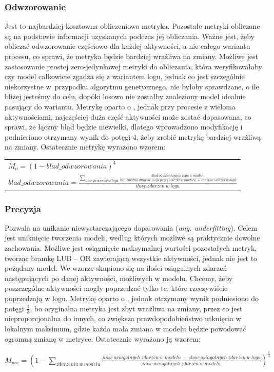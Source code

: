 \subsubsection{Odwzorowanie} 
Jest to najbardziej kosztowna obliczeniowo metryka. Pozostałe metryki obliczane są na podstawie informacji uzyskanych podczas jej obliczania. Ważne jest, żeby obliczać odwzorowanie częściowo dla każdej aktywności, a nie całego wariantu procesu, co sprawi, że metryka będzie bardziej wrażliwa na zmiany. Możliwe jest zastosowanie prostej zero-jedynkowej metryki do obliczania, która weryfikowałaby czy model całkowicie zgadza się z wariantem logu, jednak co jest szczególnie niekorzystne w~przypadku algorytmu genetycznego, nie byłoby sprawdzane, o ile bliżej jesteśmy do celu, dopóki losowo nie zostałby znaleziony model idealnie pasujący do wariantu. Metrykę oparto o \cite{metric-calculation}, jednak przy procesie z wieloma aktywnościami, najczęściej duża część aktywności może zostać dopasowana, co sprawi, że łączny błąd będzie niewielki, dlatego wprowadzono modyfikację i podniesiono otrzymany wynik do potęgi 4, żeby zrobić metrykę bardziej wrażliwą na zmiany. Ostatecznie metrykę wyrażono wzorem:
\begin{center}
\begin{tabular}{l}
$M_o = (1 - blad\_odwzorowania)^4$ \\
$blad\_odwzorowania = \frac{\sum_{ilosc\ procesow\ w\ logu} \frac{blad\ odwzorowania\ logu\ w\ modelu}{minimalna\ długosc\ najlepszej\ sciezki\ w\ modelu\ +\ długosc\ sciezki\ w\ logu}}{ilosc\ zdarzen \ w\ logu}$
\end{tabular}
\end{center}
\subsubsection{Precyzja} 
Pozwala na unikanie niewystarczającego dopasowania (\textit{ang. underfitting}). Celem jest uniknięcie tworzenia modeli, według których możliwe są praktycznie dowolne zachowania. Możliwe jest osiągnięcie maksymalnej wartości pozostałych metryk, tworząc bramkę LUB -- OR zawierającą wszystkie aktywności, jednak nie jest to pożądany model. We wzorze skupiono się na ilości osiągalnych zdarzeń następujących po danej aktywności, możliwych w modelu. Chcemy, żeby poszczególne aktywności mogły poprzedzać tylko te, które rzeczywiście poprzedzają w logu. Metrykę oparto o \cite{precision-calculation}, jednak otrzymany wynik podniesiono do potęgi $\frac{1}{3}$, bo oryginalna metryka jest zbyt wrażliwa na zmiany, przez co jest nieproporcjonalna do innych, co zwiększa prawdopodobieństwo utknięcia w lokalnym maksimum, gdzie każda mała zmiana w modelu będzie powodować ogromną zmianę w metryce. Ostatecznie wyrażono ją wzorem:
\begin{center}
$M_{pre} = (1 - \sum_{zdarzenia\ w\ modelu} \frac{ilosc\ osiagalnych\ zdarzen\ w\ modelu\ -\ ilosc\ osiagalnych\ zdarzen\ w\ logu}{ilosc\ osiagalnych\ zdarzen\ w\ modelu})^{\frac{1}{3}} $
\end{center}
